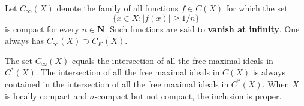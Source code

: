 Let $C_\infty(X)$ denote the family of all functions $f \in C(X)$ for which the set
$$\{x \in X : |f(x)| \geq 1/n\}$$
is compact for every $n \in \mathbf{N}$. Such functions are said to \textbf{vanish at infinity}. One always has $C_\infty(X) \supset C_K(X)$.

The set $C_\infty(X)$ equals the intersection of all the free maximal ideals in $C^*(X)$. The intersection of all the free maximal ideals in $C(X)$ is always contained in the intersection of all the free maximal ideals in $C^*(X)$. When $X$ is locally compact and $\sigma$-compact but not compact, the inclusion is proper.
